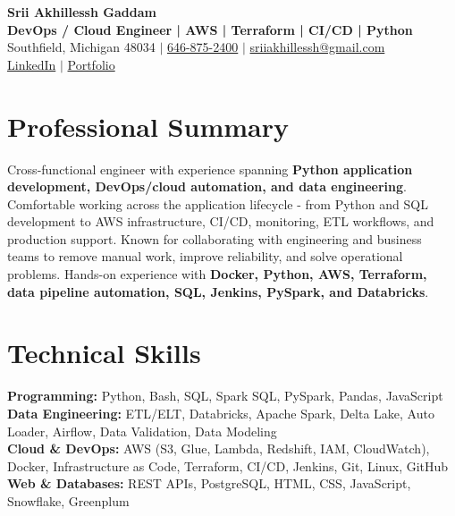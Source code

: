 \documentclass[letterpaper,10pt]{article}
\begin{document}
\fontsize{9.35pt}{10.45pt}\selectfont

\begin{center}
    {\LARGE \textbf{Srii Akhillessh Gaddam}} \\[-1pt]
    \textbf{DevOps / Cloud Engineer | AWS | Terraform | CI/CD | Python} \\[2pt]
    Southfield, Michigan 48034 $|$
    \href{tel:6468752400}{646-875-2400} $|$
    \href{mailto:sriiakhillessh@gmail.com}{sriiakhillessh@gmail.com} \\[1pt]
    \href{https://www.linkedin.com/in/srii-akhiilessh-gaddam-b48668191/}{LinkedIn} $|$
    \href{https://sriiakhillesshg.github.io/portfolio/}{Portfolio}
\end{center}
\vspace{-8pt}

\section{Professional Summary}
\small{Cross-functional engineer with experience spanning \textbf{Python application development, DevOps/cloud automation, and data engineering}. Comfortable working across the application lifecycle - from Python and SQL development to AWS infrastructure, CI/CD, monitoring, ETL workflows, and production support. Known for collaborating with engineering and business teams to remove manual work, improve reliability, and solve operational problems. Hands-on experience with \textbf{Docker, Python, AWS, Terraform, data pipeline automation, SQL, Jenkins, PySpark, and Databricks}.}

\section{Technical Skills}
\small{
\textbf{Programming:} Python, Bash, SQL, Spark SQL, PySpark, Pandas, JavaScript \\
\textbf{Data Engineering:} ETL/ELT, Databricks, Apache Spark, Delta Lake, Auto Loader, Airflow, Data Validation, Data Modeling \\
\textbf{Cloud \& DevOps:} AWS (S3, Glue, Lambda, Redshift, IAM, CloudWatch), Docker, Infrastructure as Code, Terraform, CI/CD, Jenkins, Git, Linux, GitHub \\
\textbf{Web \& Databases:} REST APIs, PostgreSQL, HTML, CSS, JavaScript, Snowflake, Greenplum
}
\end{document}
